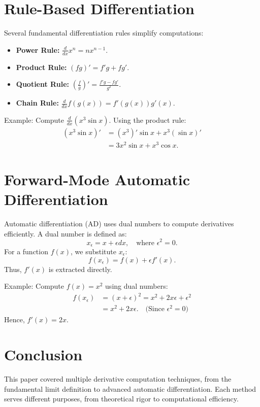 \documentclass[a4paper,12pt]{article}
\begin{document}
\section{Rule-Based Differentiation}
Several fundamental differentiation rules simplify computations:
\begin{itemize}
	\item \textbf{Power Rule:} $\frac{d}{dx} x^n = nx^{n-1}$.
	\item \textbf{Product Rule:} $(fg)' = f'g + fg'$.
	\item \textbf{Quotient Rule:} $\left(\frac{f}{g}\right)' = \frac{f'g - fg'}{g^2}$.
	\item \textbf{Chain Rule:} $\frac{d}{dx} f(g(x)) = f'(g(x)) g'(x)$.
\end{itemize}

Example: Compute $\frac{d}{dx} (x^3 \sin x)$. Using the product rule:
\begin{align*}
	(x^3 \sin x)' &= (x^3)' \sin x + x^3 (\sin x)' \\
	&= 3x^2 \sin x + x^3 \cos x.
\end{align*}

\section{Forward-Mode Automatic Differentiation}
Automatic differentiation (AD) uses dual numbers to compute derivatives efficiently. A dual number is defined as:
\begin{equation}
	x_\epsilon = x + \epsilon dx, \quad \text{where } \epsilon^2 = 0.
\end{equation}
For a function $f(x)$, we substitute $x_\epsilon$:
\begin{equation}
	f(x_\epsilon) = f(x) + \epsilon f'(x).
\end{equation}
Thus, $f'(x)$ is extracted directly.

Example: Compute $f(x) = x^2$ using dual numbers:
\begin{align*}
	f(x_\epsilon) &= (x + \epsilon)^2 = x^2 + 2x \epsilon + \epsilon^2 \\
	&= x^2 + 2x \epsilon. \quad \text{(Since $\epsilon^2 = 0$)}
\end{align*}
Hence, $f'(x) = 2x$.

\section{Conclusion}
This paper covered multiple derivative computation techniques, from the fundamental limit definition to advanced automatic differentiation. Each method serves different purposes, from theoretical rigor to computational efficiency.
\end{document}
